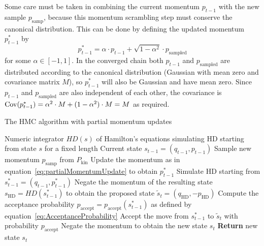 Some care must be taken in combining the current momentum $p_{t-1}$ with the new sample $p_\textrm{samp}$, because this momentum scrambling step must conserve the canonical distribution. This can be done by defining the updated momentum $p^*_{t-1}$ by
\begin{equation} \label{eq:partialMomentumUpdate}
p^*_{t-1} = \alpha \cdot p_{t-1} + \sqrt{1 - \alpha ^2} \cdot p_\textrm{sampled}
\end{equation}
for some $\alpha \in [-1, 1]$. In the converged chain both $p_{t-1}$ and $p_\textrm{sampled}$ are distributed according to the canonical distribution (Gaussian with mean zero and covariance matrix $M$), so $p^*_{t-1}$ will also be Gaussian and have mean zero. Since $p_{t-1}$ and $p_\textrm{sampled}$ are also independent of each other, the covariance is $\mathrm{Cov}(p^*_{t-1}) = \alpha^2 \cdot M + (1 - \alpha ^2) \cdot M = M$ as required.

\begin{algorithm}
\caption{The HMC algorithm with partial momentum updates}\label{alg:HMCWithPartial}
\begin{algorithmic}[1]
\Require Numeric integrator $HD(s)$ of Hamilton's equations simulating HD starting from state $s$ for a fixed length
\Require Current state $s_{t-1} = (q_{t-1}, p_{t-1})$
\State Sample new momentum $p_\textrm{samp}$ from $P_\textrm{kin}$
\State Update the momentum as in equation~\eqref{eq:partialMomentumUpdate} to obtain $p^*_{t-1}$
\State Simulate HD starting from $s^*_{t-1} = (q_{t-1}, p^*_{t-1})$
\State Negate the momentum of the resulting state $s_\textrm{HD} = HD(s^*_{t-1})$ to obtain the proposed state $\tilde{s}_t = (q_\textrm{HD}, - p_\textrm{HD})$
\State Compute the acceptance probability $p_\textrm{accept}=p_\textrm{accept}(s^*_{t-1})$ as defined by equation~\eqref{eq:AcceptanceProbability}
\State Accept the move from $s^*_{t-1}$ to $\tilde{s}_t$ with probability $p_\textrm{accept}$
\State Negate the momentum to obtain the new state $s_t$
\State \textbf{Return} new state $s_t$
\end{algorithmic}
\end{algorithm}

